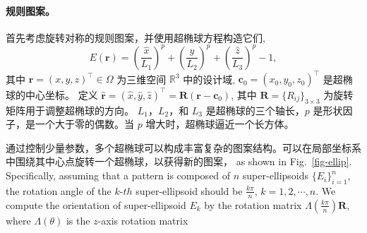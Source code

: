 \paragraph{规则图案。}首先考虑旋转对称的规则图案，并使用超椭球方程构造它们,
\begin{equation}
    \label{eq-ellipsoid}
    E(\mathbf{r})=\left(\frac{\hat{x}}{L_1}\right)^p+\left(\frac{\hat{y}}{L_2}\right)^p+\left(\frac{\hat{z}}{L_3}\right)^p-1,
\end{equation}
其中 $\mathbf{r}=(x, y, z)^\top\in\Omega$ 为三维空间 $\mathbb{R}^3$ 中的设计域,  $\mathbf{c}_0=(x_0,y_0,z_0)^\top$ 是超椭球的中心坐标。
定义 $\hat{\mathbf{r}}=(\hat{x}, \hat{y}, \hat{z})^\top=\mathbf{R}(\mathbf{r}-\mathbf{c}_0)$, 其中 $\mathbf{R}=\{R_{ij}\}_{3\times 3}$ 为旋转矩阵用于调整超椭球的方向。 $L_1$，$L_2$，和 $L_3$ 是超椭球的三个轴长，$p$ 是形状因子，是一个大于零的偶数。当 $p$ 增大时，超椭球逼近一个长方体。

通过控制少量参数，多个超椭球可以构成丰富复杂的图案结构。可以在局部坐标系中围绕其中心点旋转一个超椭球，以获得新的图案， as shown in Fig.~\ref{fig-ellip}. Specifically, assuming that a pattern is composed of $n$ super-ellipsoids $\{E_i\}_{i=1}^n$, the rotation angle of the $k$-$th$ super-ellipsoid should be $\frac{k\pi}{n}$, $k=1,2,\cdots,n$. 
We compute the orientation of super-ellipsoid $E_k$ by the rotation matrix $\Lambda(\frac{k\pi}{n})\mathbf{R}$, where $\Lambda(\theta)$ is the $z$-axis rotation matrix 
